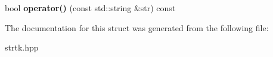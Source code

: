 \begin{DoxyCompactItemize}
\item 
\hypertarget{structstrtk_1_1size__greater__than_af1aaf1427b24b01db9c7f0e3262b6d5b}{bool {\bfseries operator()} (const std\-::string \&str) const }\label{structstrtk_1_1size__greater__than_af1aaf1427b24b01db9c7f0e3262b6d5b}

\end{DoxyCompactItemize}


The documentation for this struct was generated from the following file\-:\begin{DoxyCompactItemize}
\item 
strtk.\-hpp\end{DoxyCompactItemize}
